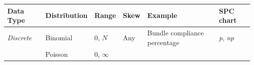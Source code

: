 \documentclass[12pt,openany]{book}
\numberwithin{dummy}{section}
\theoremstyle{ocrenumbox}
\theoremstyle{ocrenumb}
\theoremstyle{blacknumex}
\theoremstyle{blacknumbox}
\theoremstyle{ocrenum}
\begin{document}
\begin{longtable}[]{@{}llllll@{}}
\toprule
\begin{minipage}[b]{0.16\columnwidth}\raggedright
Data Type\strut
\end{minipage} & \begin{minipage}[b]{0.22\columnwidth}\raggedright
Distribution\strut
\end{minipage} & \begin{minipage}[b]{0.09\columnwidth}\raggedright
Range\strut
\end{minipage} & \begin{minipage}[b]{0.07\columnwidth}\raggedright
Skew\strut
\end{minipage} & \begin{minipage}[b]{0.13\columnwidth}\raggedright
Example\strut
\end{minipage} & \begin{minipage}[b]{0.16\columnwidth}\raggedright
SPC chart\strut
\end{minipage}\tabularnewline
\midrule
\endhead
\begin{minipage}[t]{0.16\columnwidth}\raggedright
\emph{Discrete}\strut
\end{minipage} & \begin{minipage}[t]{0.22\columnwidth}\raggedright
Binomial\strut
\end{minipage} & \begin{minipage}[t]{0.09\columnwidth}\raggedright
0, \(N\)\strut
\end{minipage} & \begin{minipage}[t]{0.07\columnwidth}\raggedright
Any\strut
\end{minipage} & \begin{minipage}[t]{0.13\columnwidth}\raggedright
Bundle compliance percentage\strut
\end{minipage} & \begin{minipage}[t]{0.16\columnwidth}\raggedright
\emph{p}, \emph{np}\strut
\end{minipage}\tabularnewline
\begin{minipage}[t]{0.16\columnwidth}\raggedright
\strut
\end{minipage} & \begin{minipage}[t]{0.22\columnwidth}\raggedright
Poisson\strut
\end{minipage} & \begin{minipage}[t]{0.09\columnwidth}\raggedright
0, \(\infty\)\strut
\end{minipage} & \begin{minipage}[t]{0.07\columnwidth}\raggedright

\end{minipage}
\end{longtable}
\end{document}
